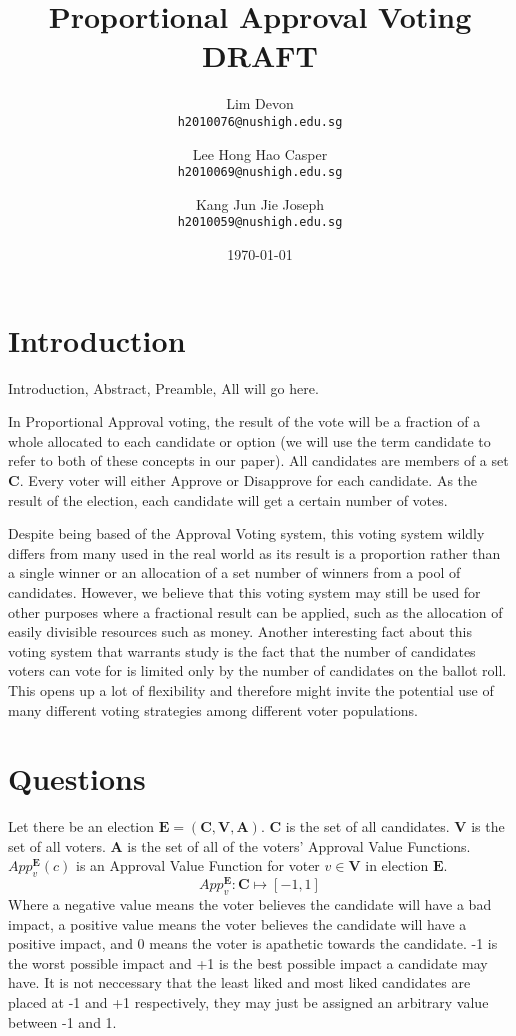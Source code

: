 \documentclass{article}
\title{Proportional Approval Voting\\DRAFT}
\author{
  Lim Devon\\
  \texttt{h2010076@nushigh.edu.sg}
  \and
  Lee Hong Hao Casper\\
  \texttt{h2010069@nushigh.edu.sg}
  \and
  Kang Jun Jie Joseph\\
  \texttt{h2010059@nushigh.edu.sg}
}
\date{\today}
\begin{document}
\maketitle

\section{Introduction}
Introduction, Abstract, Preamble, All will go here.

In Proportional Approval voting, the result of the vote will be a fraction of a whole allocated to each candidate or option (we will use the term candidate to refer to both of these concepts in our paper). All candidates are members of a set $\boldsymbol{C}$. Every voter will either Approve or Disapprove for each candidate. As the result of the election, each candidate will get a certain number of votes.

Despite being based of the Approval Voting system, this voting system wildly differs from many used in the real world as its result is a proportion rather than a single winner or an allocation of a set number of winners from a pool of candidates. However, we believe that this voting system may still be used for other purposes where a fractional result can be applied, such as the allocation of easily divisible resources such as money. Another interesting fact about this voting system that warrants study is the fact that the number of candidates voters can vote for is limited only by the number of candidates on the ballot roll. This opens up a lot of flexibility and therefore might invite the potential use of many different voting strategies among different voter populations.

\section{Questions}

Let there be an election $\boldsymbol{E} = (\boldsymbol{C}, \boldsymbol{V}, \boldsymbol{A})$.
$\boldsymbol{C}$ is the set of all candidates.
$\boldsymbol{V}$ is the set of all voters.
$\boldsymbol{A}$ is the set of all of the voters' Approval Value Functions.\\

$App^{\boldsymbol{E}}_{v}(c)$ is an Approval Value Function for voter $v \in \boldsymbol{V}$ in election $\boldsymbol{E}$.
\begin{equation}
App^{\boldsymbol{E}}_{v} : \boldsymbol{C} \mapsto [-1,1]
\end{equation}
Where a negative value means the voter believes the candidate will have a bad impact, a positive value means the voter believes the candidate will have a positive impact, and 0 means the voter is apathetic towards the candidate. -1 is the worst possible impact and +1 is the best possible impact a candidate may have. It is not neccessary that the least liked and most liked candidates are placed at -1 and +1 respectively, they may just be assigned an arbitrary value between -1 and 1.\\
\end{document}
